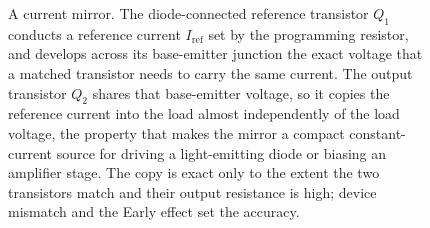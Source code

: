 \begin{figure}[htbp]
\caption[Current mirror]{A current mirror. The diode-connected reference
transistor $Q_1$ conducts a reference current $I_{\text{ref}}$ set by the
programming resistor, and develops across its base-emitter junction the exact
voltage that a matched transistor needs to carry the same current. The output
transistor $Q_2$ shares that base-emitter voltage, so it copies the reference
current into the load almost independently of the load voltage, the property
that makes the mirror a compact constant-current source for driving a
light-emitting diode or biasing an amplifier stage. The copy is exact only to
the extent the two transistors match and their output resistance is high;
device mismatch and the Early effect set the accuracy.}
\label{fig:vol04ch09:current-mirror}
\end{figure}
